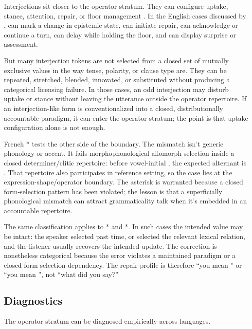 \documentclass[12pt,letterpaper]{article}
\begin{document}
Interjections sit closer to the operator stratum. They can configure uptake, stance, attention, repair, or floor management \citep{ameka1992}. In the English cases discussed by \textcite{reynolds2026interjections},  can mark a change in epistemic state,  can initiate repair,  can acknowledge or continue a turn,  can delay while holding the floor, and  can display surprise or assessment.

But many interjection tokens are not selected from a closed set of mutually exclusive values in the way tense, polarity, or clause type are. They can be repeated, stretched, blended, innovated, or substituted without producing a categorical licensing failure. In those cases, an odd interjection may disturb uptake or stance without leaving the utterance outside the operator repertoire. If an interjection-like form is conventionalized into a closed, distributionally accountable paradigm, it can enter the operator stratum; the point is that uptake configuration alone is not enough.

French * tests the other side of the boundary. The mismatch isn't generic phonology or accent. It fails morphophonological allomorph selection inside a closed determiner/clitic repertoire: before vowel-initial , the expected alternant is . That repertoire also participates in reference setting, so the case lies at the expression-shape/operator boundary. The asterisk is warranted because a closed form-selection pattern has been violated; the lesson is that a superficially phonological mismatch can attract grammaticality talk when it's embedded in an accountable repertoire.

The same classification applies to * and *. In such cases the intended value may be intact: the speaker selected past time, or selected the relevant lexical relation, and the listener usually recovers the intended update. The correction is nonetheless categorical because the error violates a maintained paradigm or a closed form-selection dependency. The repair profile is therefore \enquote{you mean } or \enquote{you mean }, not \enquote{what did you say?}

\subsection{Diagnostics}

The operator stratum can be diagnosed empirically across languages.
\end{document}

